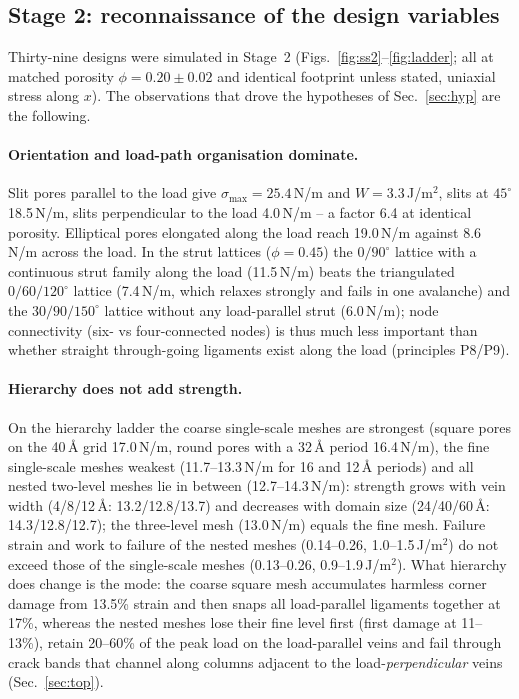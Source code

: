 \subsection{Stage 2: reconnaissance of the design variables}
Thirty-nine designs were simulated in Stage~2 (Figs.~\ref{fig:ss2}--\ref{fig:ladder}; all at matched porosity $\phi=0.20\pm0.02$ and identical footprint unless stated, uniaxial stress along $x$). The observations that drove the hypotheses of Sec.~\ref{sec:hyp} are the following.

\paragraph{Orientation and load-path organisation dominate.} Slit pores parallel to the load give $\sigma_\mathrm{max}=25.4$\,N/m and $W=3.3$\,J/m$^2$, slits at $45^\circ$ 18.5\,N/m, slits perpendicular to the load 4.0\,N/m -- a factor 6.4 at identical porosity. Elliptical pores elongated along the load reach 19.0\,N/m against 8.6\,N/m across the load. In the strut lattices ($\phi=0.45$) the $0/90^\circ$ lattice with a continuous strut family along the load (11.5\,N/m) beats the triangulated $0/60/120^\circ$ lattice (7.4\,N/m, which relaxes strongly and fails in one avalanche) and the $30/90/150^\circ$ lattice without any load-parallel strut (6.0\,N/m); node connectivity (six- vs four-connected nodes) is thus much less important than whether straight through-going ligaments exist along the load (principles P8/P9).

\paragraph{Hierarchy does not add strength.} On the hierarchy ladder the coarse single-scale meshes are strongest (square pores on the 40\,\AA{} grid 17.0\,N/m, round pores with a 32\,\AA{} period 16.4\,N/m), the fine single-scale meshes weakest (11.7--13.3\,N/m for 16 and 12\,\AA{} periods) and all nested two-level meshes lie in between (12.7--14.3\,N/m): strength grows with vein width (4/8/12\,\AA: 13.2/12.8/13.7) and decreases with domain size (24/40/60\,\AA: 14.3/12.8/12.7); the three-level mesh (13.0\,N/m) equals the fine mesh. Failure strain and work to failure of the nested meshes (0.14--0.26, 1.0--1.5\,J/m$^2$) do not exceed those of the single-scale meshes (0.13--0.26, 0.9--1.9\,J/m$^2$). What hierarchy does change is the mode: the coarse square mesh accumulates harmless corner damage from 13.5\% strain and then snaps all load-parallel ligaments together at 17\%, whereas the nested meshes lose their fine level first (first damage at 11--13\%), retain 20--60\% of the peak load on the load-parallel veins and fail through crack bands that channel along columns adjacent to the load-\emph{perpendicular} veins (Sec.~\ref{sec:top}).

